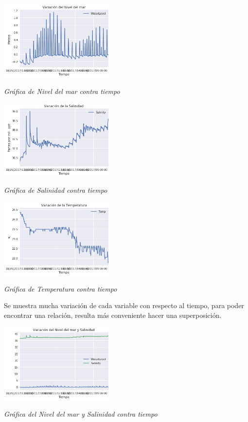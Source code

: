 \documentclass[a4paper]{article}
\begin{document}
\begin{center}
	\includegraphics[height=4cm]{Gr1.png}
    
    \textit{Gráfica de Nivel del mar contra tiempo}
\end{center}

\begin{center}
	\includegraphics[height=4cm]{Gr2.png}
    
    \textit{Gráfica de Salinidad contra tiempo}
\end{center}

\begin{center}
	\includegraphics[height=4cm]{Gr3.png}
    
    \textit{Gráfica de Temperatura contra tiempo}
\end{center}

Se muestra mucha variación de cada variable con respecto al tiempo, para poder encontrar una relación, resulta más conveniente hacer una superposición.

\begin{center}
	\includegraphics[height=4cm]{Gr4.png}
    
    \textit{Gráfica del Nivel del mar y Salinidad contra tiempo}
\end{center}
\end{document}

